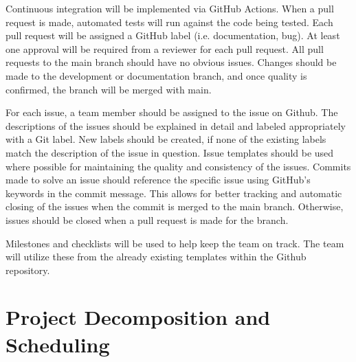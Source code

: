 \documentclass{article}
\begin{document}
Continuous integration will be implemented via GitHub Actions. When a pull request is made, automated
tests will run against the code being tested.
Each pull request will be assigned a GitHub label (i.e. documentation, bug). At least one
approval will be required from a reviewer for each pull request.
All pull requests to the main branch should have no obvious issues. Changes should be made
to the development or documentation branch, and once quality is confirmed, the branch will
be merged with main.\newline

For each issue, a team member should be assigned to the issue on Github. The descriptions
of the issues should be explained in detail and labeled appropriately with a Git label. New labels
should be created, if none of the existing labels match the description of the issue in question.
Issue templates should be used where possible for maintaining the quality and consistency of the
issues. Commits made to solve an issue should reference the specific issue using GitHub's keywords in the commit message.
This allows for better tracking and automatic closing of the issues when the commit is merged to the main branch. Otherwise,
issues should be closed when a pull request is made for the branch.\newline

Milestones and checklists will be used to help keep the team on track. The team will
utilize these from the already existing templates within the Github repository.

\section{Project Decomposition and Scheduling}
\end{document}
